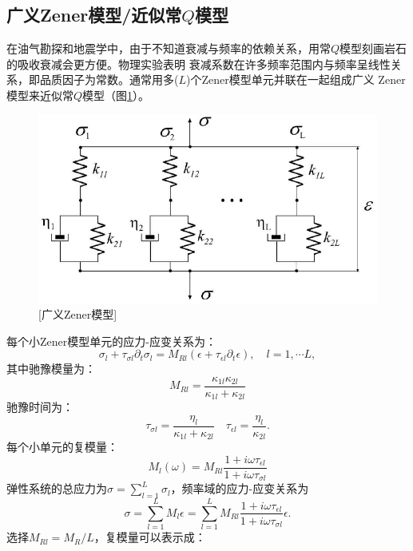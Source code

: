 \vspace{0.9cm}
\subsection{广义Zener模型/近似常$Q$模型}
\vspace{0.1cm}
在油气勘探和地震学中，由于不知道衰减与频率的依赖关系，用常$Q$模型刻画岩石的吸收衰减会更方便。物理实验表明
衰减系数在许多频率范围内与频率呈线性关系，即品质因子为常数。通常用多($L$)个Zener模型单元并联在一起组成广义
Zener模型来近似常$Q$模型（图\ref{fig:zener}）。
\begin{figure}[!htbp]
	    \centering
		\includegraphics[width=0.7\linewidth]{figure/zener}
	    [广义Zener模型]
		\label{fig:zener}
\end{figure}
每个小Zener模型单元的应力-应变关系为：
\begin{equation}
	\sigma_l+\tau_{\sigma l}\partial_t\sigma_l=M_{Rl}(\epsilon+\tau_{\epsilon l}
	\partial_t\epsilon), \quad l=1,\cdots L,
\end{equation}
其中驰豫模量为：
\begin{equation}
	M_{Rl}=\frac{\kappa_{1l}\kappa_{2l}}{\kappa_{1l}+\kappa_{2l}}
\end{equation}
驰豫时间为：
\begin{equation}
	\tau_{\sigma l}=\frac{\eta_l}{\kappa_{1l}+\kappa_{2l}} \quad \tau_{\epsilon l}=
	\frac{\eta_l}{\kappa_{2l}}.
\end{equation}
每个小单元的复模量：
\begin{equation}
	M_l(\omega)=M_{Rl}\frac{1+i\omega\tau_{\epsilon l}}{1+i\omega\tau_{\sigma l}}
\end{equation}
弹性系统的总应力为$\sigma=\sum_{l=1}^{L}\sigma_l$，频率域的应力-应变关系为
\begin{equation}
	\sigma=\sum_{l=1}^{L}M_l\epsilon=\sum_{l=1}^{L}M_{Rl}\frac{1+i\omega\tau_{\epsilon l}}
	{1+i\omega\tau_{\sigma l}}\epsilon.
\end{equation}
选择$M_{Rl}=M_R/L$，复模量可以表示成：
